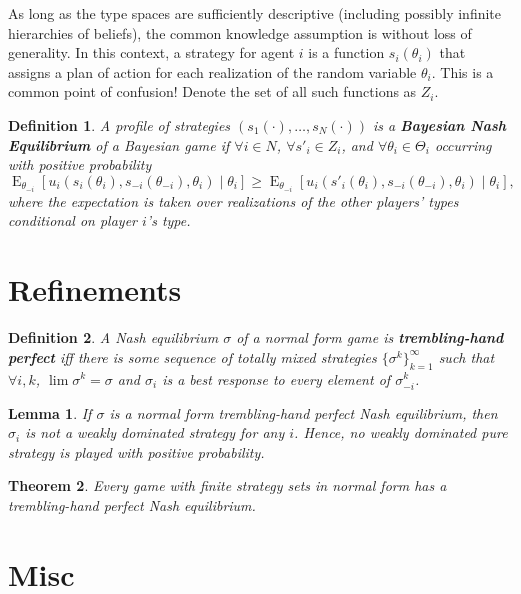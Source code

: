 \documentclass[letter, 10pt]{article}
\theoremstyle{basic}
\newtheorem{definition}{Definition}[section]
\newtheorem{theorem}{Theorem}[section]
\newtheorem{lemma}[theorem]{Lemma}
\newcommand{\E}{\operatorname{E}}
\begin{document}
\begin{spacing}{1.1}
As long as the type spaces are sufficiently descriptive (including possibly
infinite hierarchies of beliefs), the common knowledge assumption is
without loss of generality. In this context, a strategy for agent $i$ is a
function $s_i(\theta_i)$ that assigns a plan of action for each realization
of the random variable $\theta_i$. This is a common point of confusion!
Denote the set of all such functions as $Z_i$.

\begin{definition}
  A profile of strategies $(s_1(\cdot), \ldots, s_N(\cdot))$ is a
  \textbf{Bayesian Nash Equilibrium} of a Bayesian game if $\forall i \in N$, $\forall s'_i \in Z_i$, and $\forall \theta_i
  \in \Theta_i$ occurring with positive
  probability \[\E_{\theta_{-i}}\left[u_i(s_i(\theta_i), s_{-i}(\theta_{-i}),
    \theta_i) \;|\; \theta_i \right] \geq \E_{\theta_{-i}}\left[u_i(s'_i(\theta_i), s_{-i}(\theta_{-i}),
    \theta_i) \;|\; \theta_i \right], \] where the expectation is taken over
  realizations of the other players' types conditional on player $i$'s type.
\end{definition}

\section{Refinements}

\begin{definition}
  A Nash equilibrium $\sigma$ of a normal form game is
  \textbf{trembling-hand perfect} iff there is some sequence of totally
  mixed strategies $\{\sigma^k\}_{k=1}^\infty$ such that $\forall i,k$,
  $\lim \sigma^k = \sigma$ and $\sigma_i$ is a best response to every
  element of $\sigma_{-i}^k$.
\end{definition}

\begin{lemma}
  If $\sigma$ is a normal form trembling-hand perfect Nash equilibrium, then
  $\sigma_i$ is not a weakly dominated strategy for any $i$. Hence, no weakly
  dominated pure strategy is played with positive probability.
\end{lemma}

\begin{theorem}
  Every game with finite strategy sets in normal form has a trembling-hand
  perfect Nash equilibrium.
\end{theorem}

\section{Misc}


\end{spacing}
\end{document}

